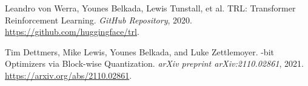 \documentclass[twocolumn, 11pt,letterpaper]{article}
\begin{document}
\begin{thebibliography}{99}
Leandro von Werra, Younes Belkada, Lewis Tunstall, et al.
\newblock TRL: Transformer Reinforcement Learning.
\newblock \emph{GitHub Repository}, 2020.
\newblock \url{https://github.com/huggingface/trl}.

Tim Dettmers, Mike Lewis, Younes Belkada, and Luke Zettlemoyer.
-bit Optimizers via Block-wise Quantization.
\newblock \emph{arXiv preprint arXiv:2110.02861}, 2021.
\newblock \url{https://arxiv.org/abs/2110.02861}.

\end{thebibliography}
\end{document}
